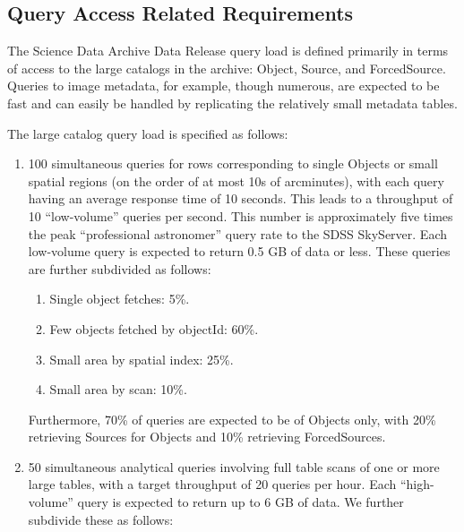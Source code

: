 \documentclass[DM,lsstdraft,toc]{lsstdoc}
\begin{document}
\subsection{Query Access Related
Requirements}\label{query-access-related-requirements}

The Science Data Archive Data Release query load is defined primarily in
terms of access to the large catalogs in the archive: Object, Source,
and ForcedSource. Queries to image metadata, for example, though
numerous, are expected to be fast and can easily be handled by
replicating the relatively small metadata tables.

The large catalog query load is specified as follows:

\begin{enumerate}
\def\labelenumi{\arabic{enumi}.}
\item
  100 simultaneous queries for rows corresponding to single Objects or
  small spatial regions (on the order of at most 10s of arcminutes),
  with each query having an average response time of 10 seconds. This
  leads to a throughput of 10 ``low-volume'' queries per second. This
  number is approximately five times the peak ``professional
  astronomer'' query rate to the SDSS SkyServer. Each low-volume query
  is expected to return 0.5 GB of data or less. These queries are
  further subdivided as follows:

  \begin{enumerate}
  \def\labelenumii{\Alph{enumii}.}
  \item
    Single object fetches: 5\%.
  \item
    Few objects fetched by objectId: 60\%.
  \item
    Small area by spatial index: 25\%.
  \item
    Small area by scan: 10\%.
  \end{enumerate}

  Furthermore, 70\% of queries are expected to be of Objects only, with
  20\% retrieving Sources for Objects and 10\% retrieving ForcedSources.
\item
  50 simultaneous analytical queries involving full table scans of one
  or more large tables, with a target throughput of 20 queries per hour.
  Each ``high-volume'' query is expected to return up to 6 GB of data.
  We further subdivide these as follows:


\end{enumerate}
\end{document}
